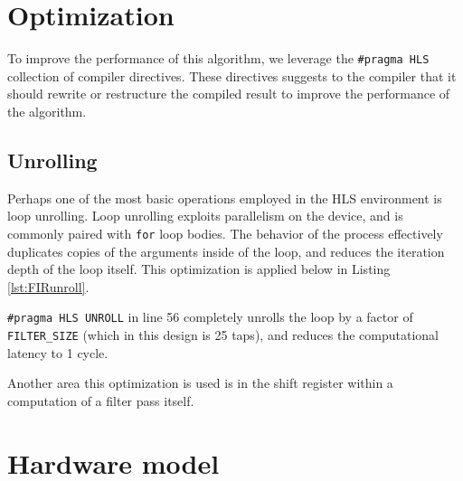 \documentclass[11pt]{report}
\begin{document}
 
 
 \section{Optimization}
 To improve the performance of this algorithm, we leverage the \texttt{\#pragma HLS} collection of compiler directives. These directives suggests to the compiler that it should rewrite or restructure the compiled result to improve the performance of the algorithm.
 
 \subsection{Unrolling}
Perhaps one of the most basic operations employed in the HLS environment is loop unrolling. Loop unrolling exploits parallelism on the device, and is commonly paired with \texttt{for} loop bodies. The behavior of the process effectively duplicates copies of the arguments inside of the loop, and reduces the iteration depth of the loop itself. This optimization is applied below in Listing \ref{lst:FIRunroll}.

\begin{singlespace}
    
\end{singlespace}

\texttt{\#pragma HLS UNROLL} in line 56 completely unrolls the loop by a factor of \texttt{FILTER\_SIZE} (which in this design is 25 taps), and reduces the computational latency to 1 cycle.

Another area this optimization is used is in the shift register within a computation of a filter pass itself.





\section{Hardware model}
\end{document}

